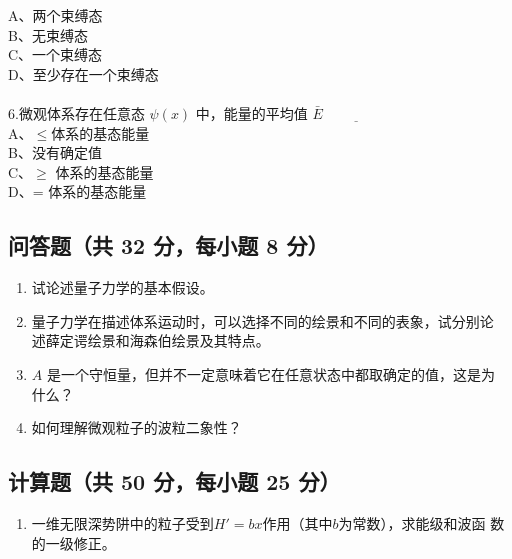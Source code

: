     A、两个束缚态\\
    B、无束缚态\\
    C、一个束缚态\\
    D、至少存在一个束缚态\\\\
6.微观体系存在任意态 $\psi(x)$ 中，能量的平均值 $\bar{E}\underline{\hspace{2cm}}$\\
    A、$\leq$体系的基态能量\\
    B、没有确定值\\
    C、$\geq$ 体系的基态能量 \\
    D、= 体系的基态能量\\
\subsection{问答题（共 32 分，每小题 8 分）}
\begin{enumerate}
\item 试论述量子力学的基本假设。
\item 量子力学在描述体系运动时，可以选择不同的绘景和不同的表象，试分别论
述薛定谔绘景和海森伯绘景及其特点。
\item $A$ 是一个守恒量，但并不一定意味着它在任意状态中都取确定的值，这是为
什么？
\item 如何理解微观粒子的波粒二象性？
\end{enumerate}
\subsection{计算题（共 50 分，每小题 25 分）}
\begin{enumerate}
\item 一维无限深势阱中的粒子受到$H' = bx$作用（其中$b$为常数），求能级和波函
数的一级修正。

\end{enumerate}

